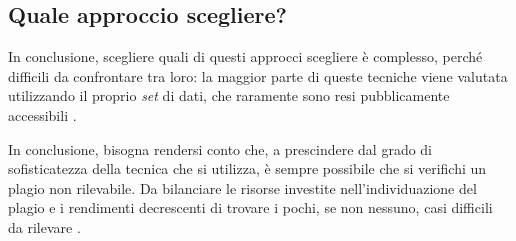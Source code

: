 \subsection{Quale approccio scegliere?}
In conclusione, scegliere quali di questi approcci scegliere è complesso, perché difficili da confrontare tra loro: la maggior parte di queste tecniche viene valutata utilizzando il proprio \textit{set} di dati, che raramente sono resi pubblicamente accessibili \cite{karnalim-budi-toba-joy-2019}.

In conclusione, bisogna rendersi conto che, a prescindere dal grado di sofisticatezza della tecnica che si utilizza, è sempre possibile che si verifichi un plagio non rilevabile.
%
Da bilanciare le risorse investite nell'individuazione del plagio e i rendimenti decrescenti di trovare i pochi, se non nessuno, casi difficili da rilevare \cite{joy-99}.


